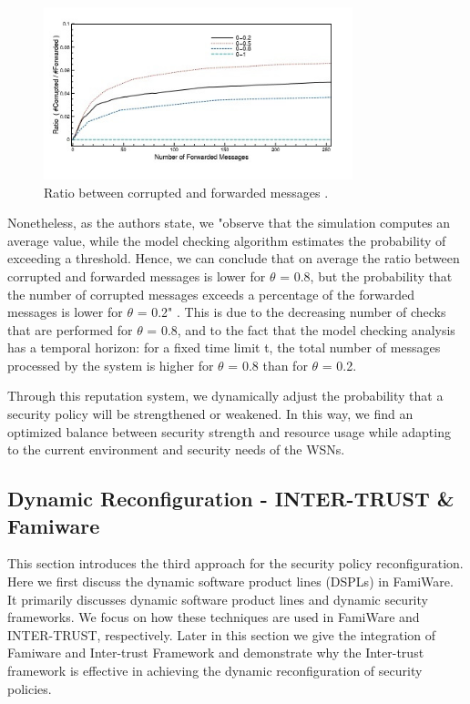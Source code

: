 \documentclass[12pt,a4paper,twoside]{report}
\begin{document}
\begin{figure}[ht]
	\begin{center}
  \includegraphics[width=0.8\textwidth,natwidth=429,natheight=239]{./figures/figure-05.jpg}
  \end{center}
  \caption{Ratio between corrupted and forwarded messages \cite{vigo;etal:2014}.}
  \label{fig:label}
\end{figure}
Nonetheless, as the authors state, we "observe that the simulation computes an average value, while the model checking algorithm estimates the probability of exceeding a threshold. Hence, we can conclude that on average the ratio between corrupted and forwarded messages is lower for $\theta$ = 0.8, but the probability that the number of corrupted messages exceeds a percentage of the forwarded messages is lower for $\theta$ = 0.2" \cite{vigo;etal:2014}. This is due to the decreasing number of checks that are performed for $\theta$ = 0.8, and to the fact that the model checking analysis has a temporal horizon: for a fixed time limit t, the total number of messages processed by the system is higher for $\theta$ = 0.8 than for $\theta$ = 0.2.\par
Through this reputation system, we dynamically adjust the probability that a security policy will be strengthened or weakened. In this way, we find an optimized balance between security strength and resource usage while adapting to the current environment and security needs of the WSNs. \par

\subsection{Dynamic Reconfiguration - INTER-TRUST \& Famiware}
This section introduces the third approach for the security policy reconfiguration. Here we first discuss the dynamic software product lines (DSPLs) in FamiWare. It primarily discusses dynamic software product lines and dynamic security frameworks. We focus on how these techniques are used in FamiWare and INTER-TRUST, respectively. Later in this section we give the integration of Famiware and Inter-trust Framework and demonstrate why the Inter-trust framework is effective in achieving the dynamic reconfiguration of security policies. 
\end{document}

